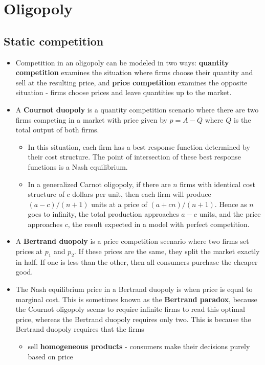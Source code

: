 \documentclass[a4paper]{article}
\begin{document}
\section{Oligopoly}
\subsection{Static competition}
\begin{itemize}
    \item Competition in an oligopoly can be modeled in two ways: \textbf{quantity competition} examines the situation where firms choose their quantity and sell at the resulting price, and \textbf{price competition} examines the opposite situation - firms choose prices and leave quantities up to the market.
    \item A \textbf{Cournot duopoly} is a quantity competition scenario where there are two firms competing in a market with price given by $p = A - Q$ where $Q$ is the total output of both firms. 
    \begin{itemize}
        \item In this situation, each firm has a best response function determined by their cost structure. The point of intersection of these best response functions is a Nash equilibrium.
        \item In a generalized Carnot oligopoly, if there are $n$ firms with identical cost structure of $c$ dollars per unit, then each firm will produce $(a-c)/(n+1)$ units at a price of $(a + cn)/(n + 1)$. Hence as $n$ goes to infinity, the total production approaches $a-c$ units, and the price approaches $c$, the result expected in a model with perfect competition. 
    \end{itemize}
    \item A \textbf{Bertrand duopoly} is a price competition scenario where two firms set prices at $p_1$ and $p_2$. If these prices are the same, they split the market exactly in half. If one is less than the other, then all consumers purchase the cheaper good. 
    \item The Nash equilibrium price in a Bertrand duopoly is when price is equal to marginal cost. This is sometimes known as the \textbf{Bertrand paradox}, because the Cournot oligopoly seems to require infinite firms to read this optimal price, whereas the Bertrand duopoly requires only two. This is because the Bertrand duopoly requires that the firms
    \begin{itemize}
        \item sell \textbf{homogeneous products} - consumers make their decisions purely based on price

\end{itemize}
\end{itemize}
\end{document}
